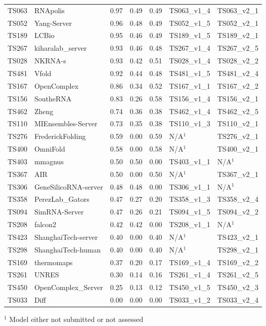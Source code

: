 \begin{table}[ht]
{\begin{tabular}{llrrrll}
TS063 & RNApolis & 0.97 & 0.49 & 0.49 & TS063\_v1\_4 & TS063\_v2\_1 \\ 
TS052 & Yang-Server & 0.96 & 0.48 & 0.49 & TS052\_v1\_5 & TS052\_v2\_1 \\ 
TS189 & LCBio & 0.95 & 0.46 & 0.49 & TS189\_v1\_5 & TS189\_v2\_1 \\ 
TS267 & kiharalab\_server & 0.93 & 0.46 & 0.48 & TS267\_v1\_4 & TS267\_v2\_5 \\ 
TS028 & NKRNA-s & 0.93 & 0.42 & 0.51 & TS028\_v1\_4 & TS028\_v2\_2 \\ 
TS481 & Vfold & 0.92 & 0.44 & 0.48 & TS481\_v1\_5 & TS481\_v2\_4 \\ 
TS167 & OpenComplex & 0.86 & 0.34 & 0.52 & TS167\_v1\_1 & TS167\_v2\_2 \\ 
TS156 & SoutheRNA & 0.83 & 0.26 & 0.58 & TS156\_v1\_4 & TS156\_v2\_1 \\ 
TS462 & Zheng & 0.74 & 0.36 & 0.38 & TS462\_v1\_4 & TS462\_v2\_5 \\ 
TS110 & MIEnsembles-Server & 0.73 & 0.35 & 0.38 & TS110\_v1\_3 & TS110\_v2\_1 \\ 
TS276 & FrederickFolding & 0.59 & 0.00 & 0.59 & N/A$^{1}$ & TS276\_v2\_1 \\ 
TS400 & OmniFold & 0.58 & 0.00 & 0.58 & N/A$^{1}$ & TS400\_v2\_1 \\ 
TS403 & mmagnus & 0.50 & 0.50 & 0.00 & TS403\_v1\_1 & N/A$^{1}$ \\ 
TS367 & AIR & 0.50 & 0.00 & 0.50 & N/A$^{1}$ & TS367\_v2\_1 \\ 
TS306 & GeneSilicoRNA-server & 0.48 & 0.48 & 0.00 & TS306\_v1\_1 & N/A$^{1}$ \\ 
TS358 & PerezLab\_Gators & 0.47 & 0.27 & 0.20 & TS358\_v1\_3 & TS358\_v2\_4 \\ 
TS094 & SimRNA-Server & 0.47 & 0.26 & 0.21 & TS094\_v1\_5 & TS094\_v2\_2 \\ 
TS208 & falcon2 & 0.42 & 0.42 & 0.00 & TS208\_v1\_1 & N/A$^{1}$ \\ 
TS423 & ShanghaiTech-server & 0.40 & 0.00 & 0.40 & N/A$^{1}$ & TS423\_v2\_1 \\ 
TS298 & ShanghaiTech-human & 0.40 & 0.00 & 0.40 & N/A$^{1}$ & TS298\_v2\_1 \\ 
TS169 & thermomaps & 0.37 & 0.20 & 0.17 & TS169\_v1\_4 & TS169\_v2\_2 \\ 
TS261 & UNRES & 0.30 & 0.14 & 0.16 & TS261\_v1\_4 & TS261\_v2\_5 \\ 
TS450 & OpenComplex\_Server & 0.25 & 0.13 & 0.12 & TS450\_v1\_5 & TS450\_v2\_3 \\ 
TS033 & Diff & 0.00 & 0.00 & 0.00 & TS033\_v1\_2 & TS033\_v2\_4 \\ 
\bottomrule
\end{tabular}%
}
\begin{flushleft}\footnotesize $^{1}$ Model either not submitted or not assessed\end{flushleft}
\end{table}

